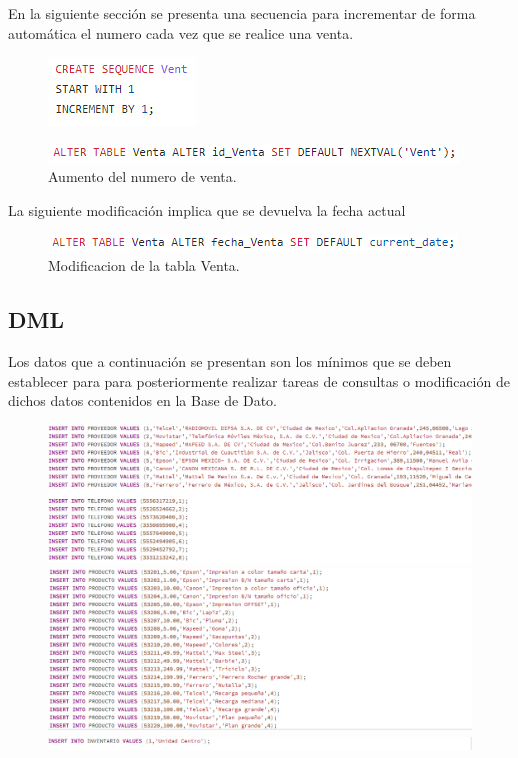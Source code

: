 \documentclass[12pt,letterpaper]{article}
\begin{document}
	En la siguiente sección se presenta una secuencia para incrementar de forma automática el numero cada vez que se realice una venta.	
	\begin{figure}[H]
		\centering
		\includegraphics[scale=0.90]{Documentacion/img/secuencia.PNG}
	\end{figure}
	\begin{figure}[H]
		\centering
		\includegraphics[scale=0.90]{Documentacion/img/aumento.PNG}
		\caption{Aumento del numero de venta.}
	\end{figure}
	La siguiente modificación implica que se devuelva la fecha actual  
	\begin{figure}[H]
		\centering
		\includegraphics[scale=0.90]{Documentacion/img/fecha.PNG}
		\caption{Modificacion de la tabla Venta.}
	\end{figure}
	
	\subsection{DML}
	Los datos que a continuación se presentan son los mínimos que se deben establecer para para posteriormente realizar tareas de consultas o modificación de dichos datos contenidos en la Base de Dato.
	
	\begin{figure}[H]
		\centering
		\includegraphics[scale=0.50]{Documentacion/img/valores1.PNG}
		\includegraphics[scale=0.50]{Documentacion/img/valores2.PNG}
		\includegraphics[scale=0.50]{Documentacion/img/valores3.PNG}
	\end{figure}
	
\end{document}
